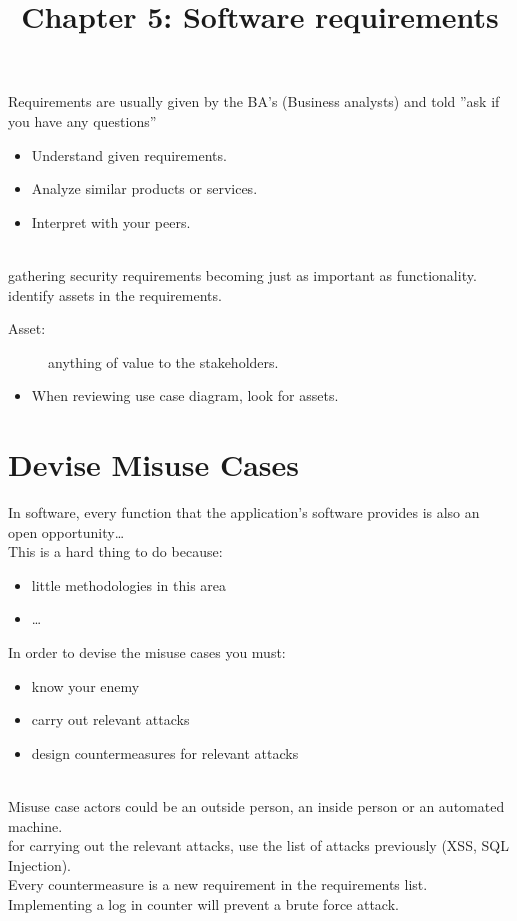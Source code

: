 \documentclass[a4paper]{article}
\begin{document}
	\title{Chapter 5: Software requirements}
	\maketitle
	Requirements are usually given by the BA's (Business analysts) and told ''ask if you have any questions''
	\begin{itemize}
		\item Understand given requirements.

		\item Analyze similar products or services.
		\item Interpret with your peers.
	\end{itemize}
	\\
	gathering security requirements becoming just as important as functionality.
\\
	identify assets in the requirements.
	\begin{description}
		\item[Asset:] anything of value to the stakeholders.
	\end{description}
	\begin{itemize}
		\item When reviewing use case diagram, look for assets.
	\end{itemize}

	\section{Devise Misuse Cases}
	In software, every function that the application's software provides is also an open
	opportunity\ldots\\
	This is a hard thing to do because:
	\begin{itemize}
		\item little methodologies in this area
		\item \ldots
	\end{itemize}
	In order to devise the misuse cases you must: 
	\begin{itemize}
		\item know your enemy
		\item carry out relevant attacks
		\item design countermeasures for relevant attacks
	\end{itemize}
	\\
	Misuse case actors could be an outside person, an inside person or an automated machine.\\
	for carrying out the relevant attacks, use the list of attacks previously (XSS, SQL Injection).\\
	Every countermeasure is a new requirement in the requirements list. Implementing a log
	in counter will prevent a brute force attack.%
\end{document}
